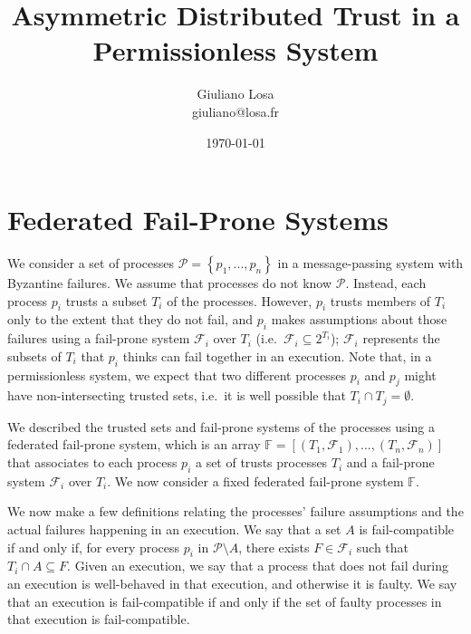 \documentclass[11pt,letterpaper]{article}
\title{Asymmetric Distributed Trust in a Permissionless System}
\date{\today}
\author{Giuliano Losa\\giuliano@losa.fr}
\begin{document}
\maketitle

\section{Federated Fail-Prone Systems}
\label{sec:basic}

We consider a set of processes $\mathcal{P}=\left\{p_1,...,p_n\right\}$ in a message-passing system with Byzantine failures.
We assume that processes do not know $\mathcal{P}$.
Instead, each process $p_i$ trusts a subset $T_i$ of the processes.
However, $p_i$ trusts members of $T_i$ only to the extent that they do not fail, and $p_i$ makes assumptions about those failures using a fail-prone system $\mathcal{F}_i$ over $T_i$ (i.e.\ $\mathcal{F}_i\subseteq 2^{T_i}$);
$\mathcal{F}_i$ represents the subsets of $T_i$ that $p_i$ thinks can fail together in an execution.
Note that, in a permissionless system, we expect that two different processes $p_i$ and $p_j$ might have non-intersecting trusted sets, i.e.\ it is well possible that $T_i\cap T_j=\emptyset$.

We described the trusted sets and fail-prone systems of the processes using a federated fail-prone system, which is an array $\mathbb{F}=\left[\left(T_1,\mathcal{F}_1\right),...,\left(T_n,\mathcal{F}_n\right)\right]$ that associates to each process $p_i$ a set of trusts processes $T_i$ and a fail-prone system $\mathcal{F}_i$ over $T_i$.
We now consider a fixed federated fail-prone system $\mathbb{F}$.

We now make a few definitions relating the processes' failure assumptions and the actual failures happening in an execution.
We say that a set $A$ is fail-compatible if and only if, for every process $p_i$ in $\mathcal{P}\setminus A$, there exists $F\in\mathcal{F}_i$ such that $T_i\cap A \subseteq F$.
Given an execution, we say that a process that does not fail during an execution is well-behaved in that execution, and otherwise it is faulty.
We say that an execution is fail-compatible if and only if the set of faulty processes in that execution is fail-compatible.
\end{document}
